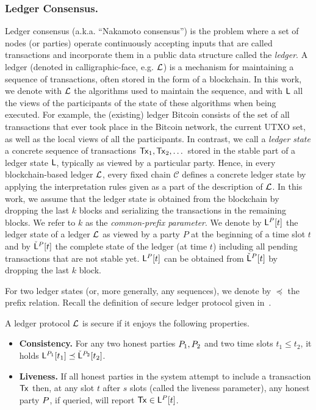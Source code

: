 \subsubsection{Ledger Consensus.}
Ledger consensus (a.k.a. ``Nakamoto consensus'') is the problem where a set of nodes
(or parties) operate continuously accepting inputs
that are called transactions and incorporate them in a public data
structure called the {\em ledger}.
A ledger (denoted in calligraphic-face, e.g. $\mathcal{L}$) is a mechanism for maintaining a sequence of transactions, often
stored in the form of a blockchain. In this work, we denote with $\mathcal{L}$
the algorithms used to maintain the sequence, and with $\mathsf{L}$ all the views of the
participants of the state of these algorithms when being executed. For example, the (existing) ledger Bitcoin
consists of the set of all transactions that ever took place in the Bitcoin network, the current UTXO set, as
well as the local views of all the participants.
In contrast, we call a \emph{ledger state} a concrete sequence of transactions $\mathsf{Tx}_1,\mathsf{Tx}_2,\dots$ stored in the stable
part of a ledger state $\mathsf{L}$, typically as viewed by a particular party. Hence, in every blockchain-based ledger $\mathcal{L}$,
every fixed chain $\mathcal{C}$ defines a concrete ledger state by applying the interpretation rules given as a part of the
description of $\mathcal{L}$. In this work, we assume that the ledger state is obtained from the blockchain by dropping the last $k$ blocks
and serializing the transactions in the remaining blocks. We refer to $k$ as the \emph{common-prefix parameter}.
We denote by $\mathsf{L}^P[t]$ the ledger state of a ledger $\mathcal{L}$ as viewed by a party $P$ at the beginning of a time slot $t$
and by ${\check {\mathsf{L}}}^{P}[t]$ the complete state of the ledger (at time $t$) including all pending transactions that are not stable yet. $\mathsf{L}^P[t]$ can be obtained from  ${\check {\mathsf{L}}}^{P}[t]$ by dropping the last $k$ block.


For two ledger states (or, more generally, any sequences), we denote by $\preceq$ the prefix relation.
Recall the definition of secure ledger protocol given in~\cite{RSA:GarKia20}.


\begin{definition}\label{de:ledger} A ledger protocol $\mathcal{L}$ is secure if it enjoys the following properties.




\begin{itemize}
  \item[]{\bf Consistency.}
    For any two honest parties $P_1,P_2$ and two time slots $t_1\leq t_2$,
    it holds  $\mathsf{L}^{P_1}[t_1] \preceq
    \check{\mathsf{L}}^{P_2}[t_2]$.

  \item[]{\bf Liveness.}
    If all honest parties in the system attempt to include a  transaction $\mathsf{Tx}$
    then, at any slot $t$ after $s$ slots (called the
    liveness parameter), any honest party $P$, if queried,
    will report $\mathsf{Tx} \in \mathsf{L}^{P}[t]$.
\end{itemize}

\end{definition}

